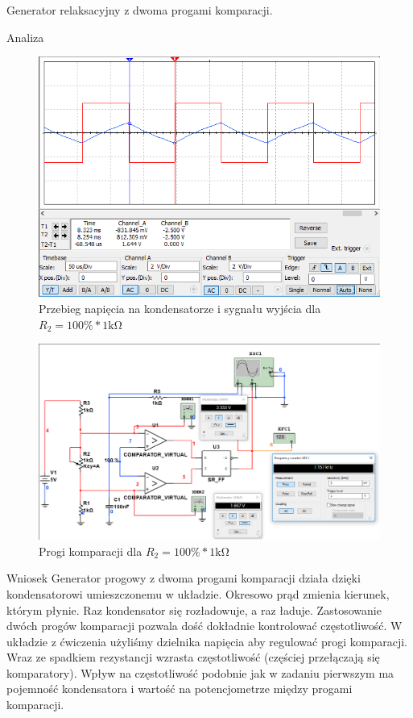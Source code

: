 \documentclass[a4paper]{scrartcl}
\begin{document}
\begin{section}{Generator relaksacyjny z dwoma progami komparacji.}
\begin{subsection}{Analiza}
				\begin{figure}[!ht]
					\begin{center}
						\includegraphics[width=.6\linewidth]{04-100proc-osc}
						\caption{Przebieg napięcia na kondensatorze i sygnału wyjścia dla $ R_{2} = 100\%*1\mathrm{k\Omega}$ }
					\end{center}
				\end{figure}

				\begin{figure}[!ht]
					\begin{center}
						\includegraphics[width=.8\linewidth]{04-100proc1k-progi}
						\caption{Progi komparacji dla $ R_{2} = 100\%*1\mathrm{k\Omega}$ }
					\end{center}
				\end{figure}
				\pagebreak
		\end{subsection}
		\begin{subsection}{Wniosek}
			Generator progowy z dwoma progami komparacji działa dzięki kondensatorowi umieszczonemu w układzie. Okresowo prąd zmienia kierunek, którym płynie. Raz kondensator się rozładowuje, a raz ładuje. Zastosowanie dwóch progów komparacji pozwala dość dokładnie kontrolować częstotliwość. W układzie z ćwiczenia użyliśmy dzielnika napięcia aby regulować progi komparacji. Wraz ze spadkiem rezystancji wzrasta częstotliwość (częściej przełączają się komparatory). Wpływ na częstotliwość podobnie jak w zadaniu pierwszym ma pojemność kondensatora i wartość na potencjometrze między progami komparacji.
		\end{subsection}
	\end{section}
\end{document}
